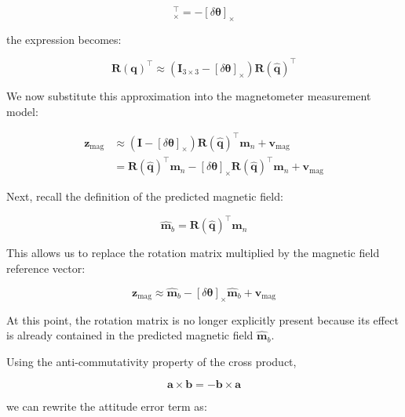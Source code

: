 \documentclass{article}
\begin{document}
	\begin{equation*}
		[\delta\boldsymbol{\theta}]_\times^\top
		= -[\delta\boldsymbol{\theta}]_\times
	\end{equation*}
	
	the expression becomes:
	
	\begin{equation*}
		\mathbf{R}(\mathbf{q})^\top \approx
		\left(\mathbf{I}_{3\times3}
		- [\delta\boldsymbol{\theta}]_\times\right)
		\mathbf{R}(\hat{\mathbf{q}})^\top
	\end{equation*}
	
	We now substitute this approximation into the magnetometer measurement model:
	
	\begin{align*}
		\mathbf{z}_{\text{mag}}
		&\approx
		\left(\mathbf{I}
		- [\delta\boldsymbol{\theta}]_\times\right)
		\mathbf{R}(\hat{\mathbf{q}})^\top \mathbf{m}_n
		+ \mathbf{v}_{\text{mag}} \\[6pt]
		&= \mathbf{R}(\hat{\mathbf{q}})^\top \mathbf{m}_n
		- [\delta\boldsymbol{\theta}]_\times
		\mathbf{R}(\hat{\mathbf{q}})^\top \mathbf{m}_n
		+ \mathbf{v}_{\text{mag}}
	\end{align*}
	
	Next, recall the definition of the predicted magnetic field:
	
	\begin{equation*}
		\hat{\mathbf{m}}_b =
		\mathbf{R}(\hat{\mathbf{q}})^\top \mathbf{m}_n
	\end{equation*}
	
	This allows us to replace the rotation matrix multiplied by the magnetic field reference vector:
	
	\begin{equation*}
		\mathbf{z}_{\text{mag}}
		\approx
		\hat{\mathbf{m}}_b
		- [\delta\boldsymbol{\theta}]_\times
		\hat{\mathbf{m}}_b
		+ \mathbf{v}_{\text{mag}}
	\end{equation*}
	
	At this point, the rotation matrix is no longer explicitly present because its effect is already contained in the predicted magnetic field $\hat{\mathbf{m}}_b$.
	
	Using the anti-commutativity property of the cross product,
	
	\begin{equation*}
		\mathbf{a}\times\mathbf{b}
		= -\mathbf{b}\times\mathbf{a}
	\end{equation*}
	
	we can rewrite the attitude error term as:
	
\end{document}
